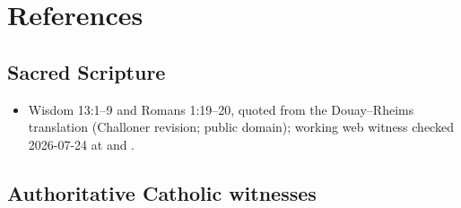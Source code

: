 \section{References}

\begingroup
\setlength{\parskip}{0pt}
\titlespacing*{\subsection}{0pt}{1.0ex}{0.3ex}

\subsection*{Sacred Scripture}

{\fontsize{8.6}{9.6}\selectfont
\begin{itemize}[itemsep=0pt,parsep=0pt,topsep=0.05em]
\item Wisdom 13:1--9 and Romans 1:19--20, quoted from the Douay--Rheims translation (Challoner revision; public domain); working web witness checked 2026-07-24 at  and .
\end{itemize}}

\subsection*{Authoritative Catholic witnesses}

